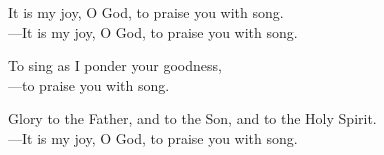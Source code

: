 \responsory

\noindent It is my joy, O God, to praise you with song.\\
{\color{red}---\thinspace}It is my joy, O God, to praise you with song.

\medskip\noindent To sing as I ponder your goodness,\\
{\color{red}---\thinspace}to praise you with song.

\medskip\noindent Glory to the Father, and to the Son, and to the Holy Spirit.\\
{\color{red}---\thinspace}It is my joy, O God, to praise you with song.